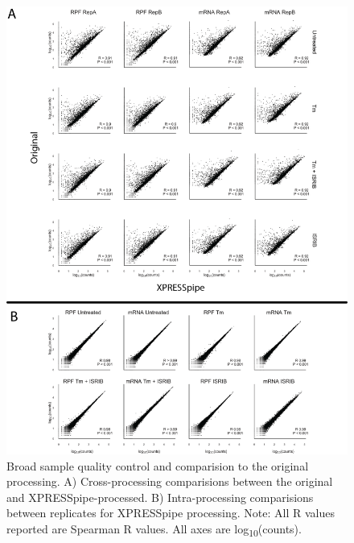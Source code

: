 \documentclass[11pt, a4paper, oneside]{article}
\begin{document}
\begin{figure}
\centering
  \includegraphics[width=160mm]{figures/xpresspipe_figure2.png}
  \caption{Broad sample quality control and comparision to the original processing. A) Cross-processing comparisions between the original and XPRESSpipe-processed. B) Intra-processing comparisions between replicates for XPRESSpipe processing. Note: All R values reported are Spearman R values. All axes are log\textsubscript{10}(counts).}
  \label{fig:figure2}
\end{figure}
\end{document}
